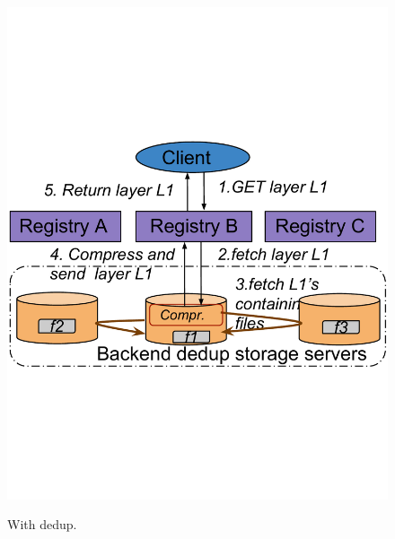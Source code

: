 \begin{figure}[t]
\begin{minipage}{0.225\textwidth}
		\includegraphics[width=1\textwidth]{graphs/dedup.pdf}
		\caption{With dedup.}
		\vspace{-3pt}
		\label{fig:with-dedup}
	\end{minipage}
\end{figure}